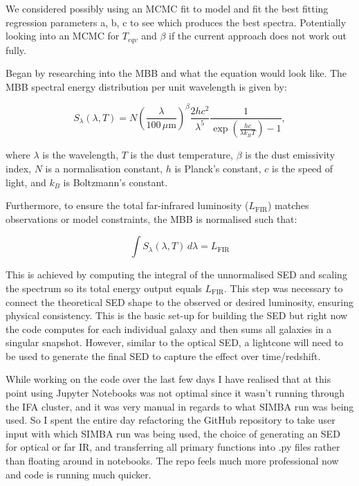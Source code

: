 \documentclass[a4paper, 11pt, oneside]{researchjournal} %
\begin{document}
We considered possibly using an MCMC fit to model and fit the best fitting regression parameters a, b, c to see which produces the best spectra. Potentially looking into an MCMC for $T_{eqv}$ and $\beta$ if the current approach does not work out fully. 

Began by researching into the MBB and what the equation would look like. The MBB spectral energy distribution per unit wavelength is given by:

\begin{equation}
    S_\lambda(\lambda, T) = N \left( \frac{\lambda}{100\,\mu\mathrm{m}} \right)^\beta \frac{2 h c^2}{\lambda^5} \frac{1}{\exp\left(\frac{h c}{\lambda k_B T}\right) - 1},
    \label{eq:mbb}
\end{equation}

\noindent where $\lambda$ is the wavelength, $T$ is the dust temperature, $\beta$ is the dust emissivity index, $N$ is a normalisation constant, $h$ is Planck's constant, $c$ is the speed of light, and $k_B$ is Boltzmann's constant.

Furthermore, to ensure the total far-infrared luminosity ($L_\mathrm{FIR}$) matches observations or model constraints, the MBB is normalised such that:

\begin{equation}
    \int S_\lambda(\lambda, T)\, d\lambda = L_\mathrm{FIR}
\end{equation}

This is achieved by computing the integral of the unnormalised SED and scaling the spectrum so its total energy output equals $L_\mathrm{FIR}$. This step was necessary to connect the theoretical SED shape to the observed or desired luminosity, ensuring physical consistency. This is the basic set-up for building the SED but right now the code computes for each individual galaxy and then sums all galaxies in a singular snapshot. However, similar to the optical SED, a lightcone will need to be used to generate the final SED to capture the effect over time/redshift. 


While working on the code over the last few days I have realised that at this point using Jupyter Notebooks was not optimal since it wasn't running through the IFA cluster, and it was very manual in regards to what SIMBA run was being used. So I spent the entire day refactoring the GitHub repository to take user input with which SIMBA run was being used, the choice of generating an SED for optical or far IR, and transferring all primary functions into .py files rather than floating around in notebooks. The repo feels much more professional now and code is running much quicker.
\end{document}
